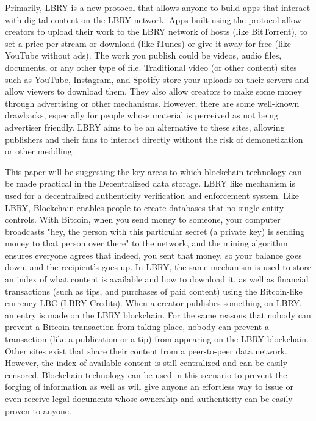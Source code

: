 \documentclass[conference]{IEEEtran}
\begin{document}
Primarily, LBRY\cite{b1} is a new protocol that allows anyone to build apps that interact with digital content on the LBRY network. Apps built using the protocol allow creators to upload their work to the LBRY network of hosts (like BitTorrent), to set a price per stream or download (like iTunes) or give it away for free (like YouTube without ads). The work you publish could be videos, audio files, documents, or any other type of file. Traditional video (or other content) sites such as YouTube, Instagram, and Spotify store your uploads on their servers and allow viewers to download them. They also allow creators to make some money through advertising or other mechanisms. However, there are some well-known drawbacks, especially for people whose material is perceived as not being advertiser friendly. LBRY\cite{b1} aims to be an alternative to these sites, allowing publishers and their fans to interact directly without the risk of demonetization or other meddling. 

This paper will be suggesting the key areas to which blockchain technology can be made practical in the Decentralized data storage. LBRY like mechanism is used for a decentralized authenticity verification and enforcement system. Like LBRY, Blockchain enables people to create databases that no single entity controls. With Bitcoin\cite{b6}, when you send money to someone, your computer broadcasts "hey, the person with this particular secret (a private key) is sending money to that person over there" to the network, and the mining algorithm ensures everyone agrees that indeed, you sent that money, so your balance goes down, and the recipient's goes up. In LBRY, the same mechanism is used to store an index of what content is available and how to download it, as well as financial transactions (such as tips, and purchases of paid content) using the Bitcoin-like currency LBC (LBRY Credits). When a creator publishes something on LBRY, an entry is made on the LBRY blockchain. For the same reasons that nobody can prevent a Bitcoin transaction from taking place, nobody can prevent a transaction (like a publication or a tip) from appearing on the LBRY\cite{b1} blockchain. Other sites exist that share their content from a peer-to-peer data network. However, the index of available content is still centralized and can be easily censored. Blockchain technology can be used in this scenario to prevent the forging of information as well as will give anyone an effortless way to issue or even receive legal documents whose ownership and authenticity can be easily proven to anyone. 
\end{document}
